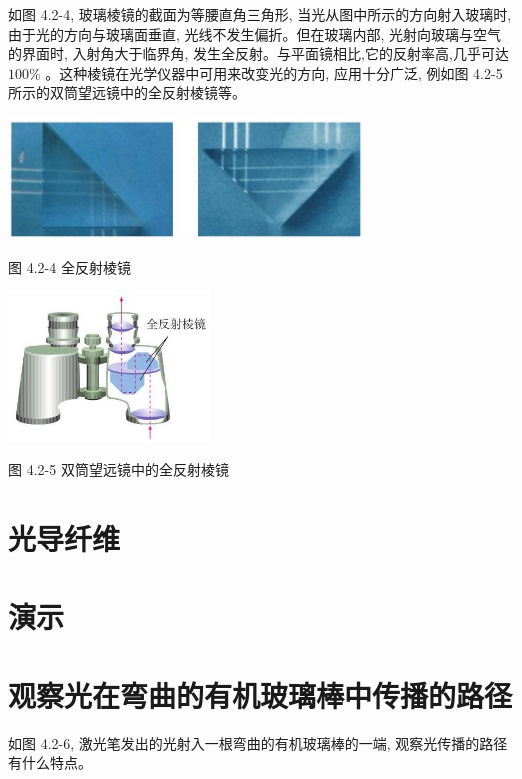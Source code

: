 \documentclass[10pt]{article}
\begin{document}
如图 4.2-4, 玻璃棱镜的截面为等腰直角三角形, 当光从图中所示的方向射入玻璃时, 由于光的方向与玻璃面垂直, 光线不发生偏折。但在玻璃内部, 光射向玻璃与空气的界面时, 入射角大于临界角, 发生全反射。与平面镜相比,它的反射率高,几乎可达 \({100}\%\) 。这种棱镜在光学仪器中可用来改变光的方向, 应用十分广泛, 例如图 4.2-5 所示的双筒望远镜中的全反射棱镜等。

\begin{center}
\includegraphics[max width=0.7\textwidth]{images/01910e4c-ebb8-7d2c-8f2f-2375bc1d2d12_97_690247.jpg}
\end{center}

图 4.2-4 全反射棱镜

\begin{center}
\includegraphics[max width=0.4\textwidth]{images/01910e4c-ebb8-7d2c-8f2f-2375bc1d2d12_97_545043.jpg}
\end{center}

图 4.2-5 双筒望远镜中的全反射棱镜

\section*{光导纤维}

\section*{演示}

\section*{观察光在弯曲的有机玻璃棒中传播的路径}

如图 4.2-6, 激光笔发出的光射入一根弯曲的有机玻璃棒的一端, 观察光传播的路径有什么特点。
\end{document}
